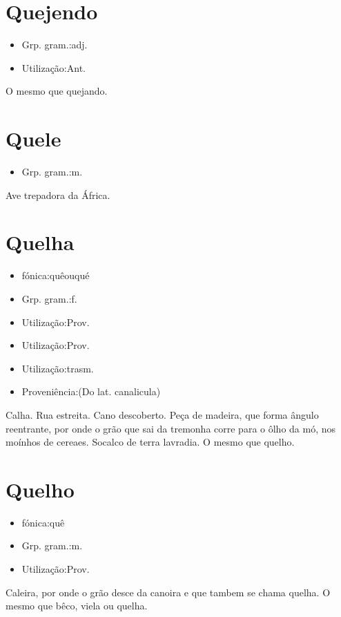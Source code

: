 \section{Quejendo}
\begin{itemize}
\item {Grp. gram.:adj.}
\end{itemize}
\begin{itemize}
\item {Utilização:Ant.}
\end{itemize}
O mesmo que \textunderscore quejando\textunderscore .
\section{Quele}
\begin{itemize}
\item {Grp. gram.:m.}
\end{itemize}
Ave trepadora da África.
\section{Quelha}
\begin{itemize}
\item {fónica:quêouqué}
\end{itemize}
\begin{itemize}
\item {Grp. gram.:f.}
\end{itemize}
\begin{itemize}
\item {Utilização:Prov.}
\end{itemize}
\begin{itemize}
\item {Utilização:Prov.}
\end{itemize}
\begin{itemize}
\item {Utilização:trasm.}
\end{itemize}
\begin{itemize}
\item {Proveniência:(Do lat. \textunderscore canalicula\textunderscore )}
\end{itemize}
Calha.
Rua estreita.
Cano descoberto.
Peça de madeira, que forma ângulo reentrante, por onde o grão que sai da tremonha corre para o ôlho da mó, nos moínhos de cereaes.
Socalco de terra lavradia.
O mesmo que \textunderscore quelho\textunderscore .
\section{Quelho}
\begin{itemize}
\item {fónica:quê}
\end{itemize}
\begin{itemize}
\item {Grp. gram.:m.}
\end{itemize}
\begin{itemize}
\item {Utilização:Prov.}
\end{itemize}
Caleira, por onde o grão desce da canoira e que tambem se chama \textunderscore quelha\textunderscore .
O mesmo que \textunderscore bêco\textunderscore , viela ou quelha.
